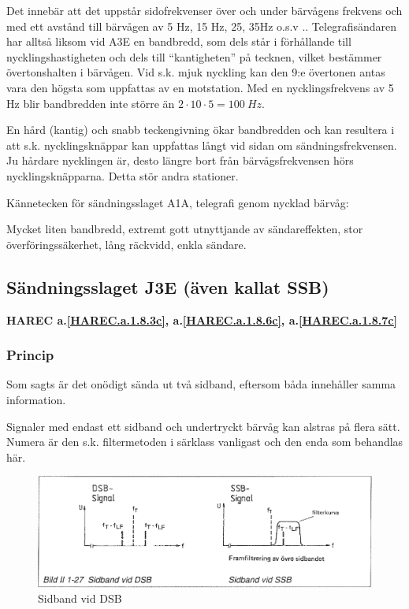 Det innebär att det uppstår sidofrekvenser över och under bärvågens frekvens och
med ett avstånd till bärvågen av 5 Hz, 15 Hz, 25, 35Hz o.s.v ..
Telegrafisändaren har alltså liksom vid A3E en bandbredd, som dels står i
förhållande till nycklingshastigheten och dels till ``kantigheten'' på tecknen,
vilket bestämmer övertonshalten i bärvågen. Vid s.k. mjuk nyckling kan den 9:e
övertonen antas vara den högsta som uppfattas av en motstation. Med en
nycklingsfrekvens av 5 Hz blir bandbredden inte större än
\(2 \cdot 10 \cdot 5 = 100\ Hz\).

En hård (kantig) och snabb teckengivning ökar bandbredden och kan resultera i
att s.k. nycklingsknäppar kan uppfattas långt vid sidan om sändningsfrekvensen.
Ju hårdare nycklingen är, desto längre bort från bärvågsfrekvensen hörs
nycklingsknäpparna. Detta stör andra stationer.

Kännetecken för sändningsslaget A1A, telegrafi genom nycklad bärvåg:

Mycket liten bandbredd, extremt gott utnyttjande av sändareffekten, stor
överföringssäkerhet, lång räckvidd, enkla sändare.

\subsection{Sändningsslaget J3E (även kallat SSB)}
\textbf{HAREC a.\ref{HAREC.a.1.8.3c}, a.\ref{HAREC.a.1.8.6c}, a.\ref{HAREC.a.1.8.7c}\label{myHAREC.a.1.8.3c}\label{myHAREC.a.1.8.6c}\label{myHAREC.a.1.8.7c}}

\subsubsection{Princip}

Som sagts är det onödigt sända ut två sidband, eftersom båda innehåller samma
information.

Signaler med endast ett sidband och undertryckt bärvåg kan alstras på flera
sätt. Numera är den s.k. filtermetoden i särklass vanligast och den enda som
behandlas här.

\begin{figure}
\includegraphics[width=\textwidth]{images/bild_2_1-27}
\caption{Sidband vid DSB}
\label{fig:BildII1-27}
\end{figure}

